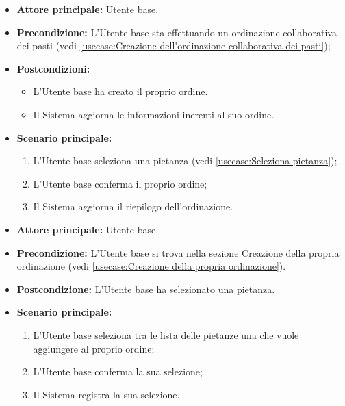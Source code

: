 \label{usecase:Creazione della propria ordinazione}
\begin{itemize}
	\item \textbf{Attore principale:} Utente base.

	\item \textbf{Precondizione:} L'Utente base sta effettuando un ordinazione collaborativa dei pasti (vedi \autoref{usecase:Creazione dell'ordinazione collaborativa dei pasti});

	\item \textbf{Postcondizioni:}
		\begin{itemize}
			\item L'Utente base ha creato il proprio ordine.
			\item Il Sistema aggiorna le informazioni inerenti al suo ordine.
		\end{itemize}

	\item \textbf{Scenario principale:}
	      \begin{enumerate}
		      \item L'Utente base seleziona una pietanza (vedi \autoref{usecase:Seleziona pietanza});
		      \item L'Utente base conferma il proprio ordine;
		      \item Il Sistema aggiorna il riepilogo dell'ordinazione.
	      \end{enumerate}
\end{itemize}


\label{usecase:Seleziona pietanza}
\begin{itemize}
	\item \textbf{Attore principale:} Utente base.

	\item \textbf{Precondizione:} L'Utente base si trova nella sezione Creazione della propria ordinazione (vedi \autoref{usecase:Creazione della propria ordinazione}).

	\item \textbf{Postcondizione:} L'Utente base ha selezionato una pietanza.

	\item \textbf{Scenario principale:}
	      \begin{enumerate}
		      \item L'Utente base seleziona tra le lista delle pietanze una che vuole aggiungere al proprio ordine;
		      \item L'Utente base conferma la sua selezione;
		      \item Il Sistema registra la sua selezione.
	      \end{enumerate}
\end{itemize}

